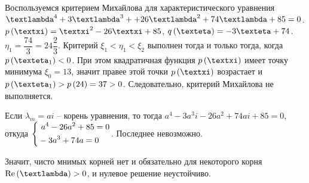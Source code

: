 \documentclass[a5paper,10pt]{article}
\begin{document}
Воспользуемся критерием Михайлова для характеристического уравнения 
$\lambda^4 + 3\lambda^3 + \linebreak + 26\lambda^2 + 74\lambda + 85 = 0$.
$p\br{\xi} = \xi^2 - 26\xi + 85$,
$q\br{\eta} = -3\eta + 74$.
$\eta_{1} = \dfrac {74} {3} = 24 \dfrac {2}{3}$.
Критерий $\xi_{1} < \eta_{1} < \xi_{2}$ выполнен тогда и только тогда, когда $p\br{\eta_{1}} < 0$. При этом квадратичная функция $p\br{\xi}$ имеет точку минимума $\xi_{0} = 13$, значит правее этой точки $p\br{\xi}$ возрастает и 
$p\br{\eta_{1}} > p\br{24} = 37 > 0$. Следовательно, критерий Михайлова не выполняется.

Если $\lambda_{m} = ai$ -- корень уравнения, то тогда $a^4 - 3a^3 i - 26a^2 + 74 ai + 85 = 0$, откуда 
$\left\{ \begin{aligned}&\ a^4 - 26a^2 + 85 = 0 \\& -3a^3 + 74a = 0\end{aligned} \right.$. Последнее невозможно.

Значит, чисто мнимых корней нет и обязательно для некоторого корня $\Re\br{\lambda} > 0$, и нулевое решение неустойчиво.
\end{document}
